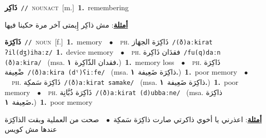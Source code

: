 \documentclass[10pt,a4paper,twoside]{article} %
\begin{document}
\begin{multicols}{2}
{\setlength\topsep{0pt}\textbf{\foreignlanguage{arabic}{ذَاكِر}}\ {\color{gray}\texttt{//}\color{black}}\ \textsc{noun\textunderscore act}\ [m.]\ \textbf{1.}~remembering\  \begin{flushright}\color{gray}\foreignlanguage{arabic}{\textbf{\underline{\foreignlanguage{arabic}{أمثلة}}}: مش ذاكِر إِيمتى آخر مرة حكينا فيها}\end{flushright}\color{black}} \vspace{2mm}

{\setlength\topsep{0pt}\textbf{\foreignlanguage{arabic}{ذَاكِرَة}}\ {\color{gray}\texttt{//}\color{black}}\ \textsc{noun}\ [f.]\ \textbf{1.}~memory\ \ $\bullet$\ \ \textsc{ph.} \color{gray} \foreignlanguage{arabic}{ذَاكِرَة الجهَاز}\color{black}\ {\color{gray}\texttt{/{\sffamily (ð)aːkirat ʔil(dʒ)ihaːz}/}\color{black}}\ \textbf{1.}~device memory\ \ $\bullet$\ \ \textsc{ph.} \color{gray} \foreignlanguage{arabic}{فقدَان ذَاكِرة}\color{black}\ {\color{gray}\texttt{/{\sffamily fu(q)daːn (ð)aːkira}/}\color{black}}\ \color{gray} (msa. \foreignlanguage{arabic}{فقدان الذّاكِرة}~\foreignlanguage{arabic}{\textbf{١.}})\color{black}\ \textbf{1.}~memory loss\ \ $\bullet$\ \ \textsc{ph.} \color{gray} \foreignlanguage{arabic}{ذَاكِرَة ضْعِيفة}\color{black}\ {\color{gray}\texttt{/{\sffamily (ð)aːkira (dˤ)ʕiːfe}/}\color{black}}\ \color{gray} (msa. \foreignlanguage{arabic}{ذاكِرَة ضَعِيفة}~\foreignlanguage{arabic}{\textbf{١.}})\color{black}\ \textbf{1.}~poor memory\ \ $\bullet$\ \ \textsc{ph.} \color{gray} \foreignlanguage{arabic}{ذَاكِرَة سَمكِة}\color{black}\ {\color{gray}\texttt{/{\sffamily (ð)aːkirat samake}/}\color{black}}\ \color{gray} (msa. \foreignlanguage{arabic}{ذاكِرَة ضَعِيفة}~\foreignlanguage{arabic}{\textbf{١.}})\color{black}\ \textbf{1.}~poor memory\ \ $\bullet$\ \ \textsc{ph.} \color{gray} \foreignlanguage{arabic}{ذَاكِرَة ذُبَّانِة}\color{black}\ {\color{gray}\texttt{/{\sffamily (ð)aːkirat (d)ubbaːne}/}\color{black}}\ \color{gray} (msa. \foreignlanguage{arabic}{ذاكِرَة ضَعِيفة}~\foreignlanguage{arabic}{\textbf{١.}})\color{black}\ \textbf{1.}~poor memory\  \begin{flushright}\color{gray}\foreignlanguage{arabic}{\textbf{\underline{\foreignlanguage{arabic}{أمثلة}}}: اعذرني يا أخوي ذاكرتي صارت ذاكِرَة سَمكِة\ $\bullet$\ \  صحت من العملية وبقت الذاكِرَة عندها مش كويس}\end{flushright}\color{black}} \vspace{2mm}


\end{multicols}
\end{document}
